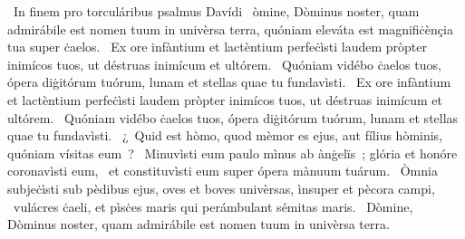 {~In finem pro torculáribus psalmus Davídi}
{%
~òmine, Dòminus noster, quam admirábile est nomen tuum in univèrsa terra, quóniam eleváta est magnifiċènçia tua super ċaelos.
~Ex ore infàntium et lactèntium perfeċìsti laudem pròpter inimícos tuos, ut déstruas inimícum et ultórem.
~Quóniam vidébo ċaelos tuos, ópera diġitórum tuórum, lunam et stellas quae tu fundavìsti.
~Ex ore infàntium et lactèntium perfeċìsti laudem pròpter inimícos tuos, ut déstruas inimícum et ultórem.
~Quóniam vidébo ċaelos tuos, ópera diġitórum tuórum, lunam et stellas quae tu fundavìsti.
~¿~Quid est hòmo, quod mèmor es ejus, aut fílius hòminis, quóniam vísitas eum~?
~Minuvìsti eum paulo mìnus ab ànġelïs~; glória et honóre coronavìsti eum,
~et constituvìsti eum super ópera mànuum tuárum.
~Òmnia subjeċìsti sub pèdibus ejus, oves et boves univèrsas, ìnsuper et pècora campi,
~vulácres ċaeli, et pìsċes maris qui perámbulant sémitas maris.
~Dòmine, Dòminus noster, quam admirábile est nomen tuum in univèrsa terra.}

